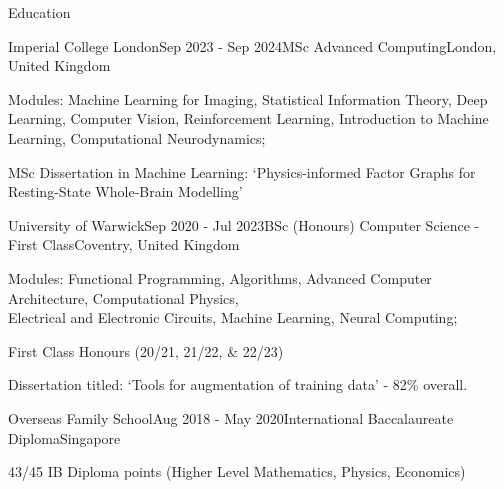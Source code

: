 \documentclass{resume}
\begin{document}
    \begin{rSection}{Education}
        \begin{rSubsection}{Imperial College London}{Sep 2023 - Sep 2024}{MSc Advanced Computing}{London, United Kingdom}{}
            \item Modules: Machine Learning for Imaging, Statistical Information Theory, Deep Learning, Computer Vision, Reinforcement Learning, Introduction to Machine Learning, Computational Neurodynamics; 
            \item MSc Dissertation in Machine Learning: `Physics-informed Factor Graphs for Resting-State Whole-Brain Modelling'
        \end{rSubsection}
        \begin{rSubsection}{University of Warwick}{Sep 2020 - Jul 2023}{BSc (Honours) Computer Science - First Class}{Coventry, United Kingdom}{}
        \item Modules: Functional Programming, Algorithms, Advanced Computer Architecture, Computational Physics, \\Electrical and Electronic Circuits, Machine Learning, Neural Computing;
        \item First Class Honours (20/21, 21/22, \& 22/23)
        \item Dissertation titled: `Tools for augmentation of training data' - 82\% overall.
        \end{rSubsection}
        \begin{rSubsection}{Overseas Family School}{Aug 2018 - May 2020}{International Baccalaureate Diploma}{Singapore}{}
        \item 43/45 IB Diploma points (Higher Level Mathematics, Physics, Economics)
        \end{rSubsection}
    \end{rSection} 
\end{document}

